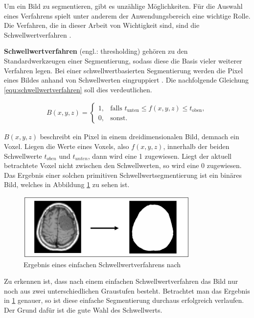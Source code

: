 Um ein Bild zu segmentieren, gibt es unzählige Möglichkeiten. Für die Auswahl eines
Verfahrens spielt unter anderem der Anwendungsbereich eine wichtige Rolle. Die
Verfahren, die in dieser Arbeit von Wichtigkeit sind, sind die
Schwellwertverfahren \citep[vgl.][S.~361]{lehmann2013bildverarbeitung}.

\pagebreak

\textbf{Schwellwertverfahren} (engl.: thresholding) gehören zu den Standardwerkzeugen
einer Segmentierung, sodass diese die Basis vieler weiterer Verfahren legen. Bei
einer schwellwertbasierten Segmentierung werden die Pixel eines Bildes anhand von
Schwellwerten eingruppiert \citep[vgl.][S.~96]{handels2000}. Die nachfolgende Gleichung
\ref{equ:schwellwertverfahren} soll dies verdeutlichen.

\begin{align}
	\label{equ:schwellwertverfahren}B(x, y, z) = \begin{cases}1,&\text{falls }t_{\text{unten}}\leq f(x, y, z) \leq t_{\text{oben}}, \\ 0,&\text{sonst}.\end{cases}
\end{align}

$B(x, y, z)$ beschreibt ein Pixel in einem dreidimensionalen Bild, demnach ein Voxel.
Liegen die Werte eines Voxels, also $f(x, y, z)$, innerhalb der beiden
Schwellwerte $t_{oben}$ und $t_{unten}$, dann wird eine 1 zugewiesen. Liegt der
aktuell betrachtete Voxel nicht zwischen den Schwellwerten, so wird eine 0 zugewiesen.
Das Ergebnis einer solchen primitiven Schwellwertsegmentierung ist ein binäres
Bild, welches in Abbildung \ref{fig:binäres_schwellwertverfahren} zu sehen ist.

\begin{figure}[h]
	\centering
	\includegraphics[width=0.8\textwidth]{img/beispiel_schwellwertverfahren.jpg}
	\caption{Ergebnis eines einfachen Schwellwertverfahrens nach \citet[S.~96]{handels2000}}
	\label{fig:binäres_schwellwertverfahren}
\end{figure}

Zu erkennen ist, dass nach einem einfachen Schwellwertverfahren das Bild nur noch
aus zwei unterschiedlichen Graustufen besteht. Betrachtet man das Ergebnis in
\ref{fig:binäres_schwellwertverfahren} genauer, so ist diese einfache Segmentierung
durchaus erfolgreich verlaufen. Der Grund dafür ist die gute Wahl des
Schwellwerts.

